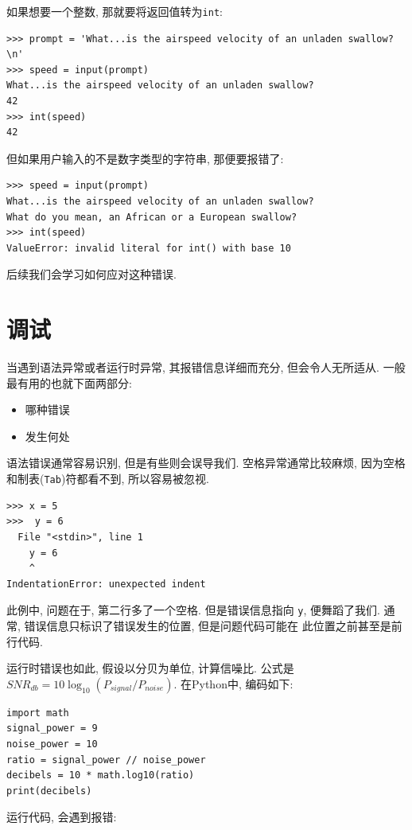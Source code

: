 \documentclass[10pt]{book}
\begin{document}
如果想要一个整数, 那就要将返回值转为{\tt int}:

\begin{verbatim}
>>> prompt = 'What...is the airspeed velocity of an unladen swallow?\n'
>>> speed = input(prompt)
What...is the airspeed velocity of an unladen swallow?
42
>>> int(speed)
42
\end{verbatim}
%
但如果用户输入的不是数字类型的字符串, 那便要报错了:

\begin{verbatim}
>>> speed = input(prompt)
What...is the airspeed velocity of an unladen swallow?
What do you mean, an African or a European swallow?
>>> int(speed)
ValueError: invalid literal for int() with base 10
\end{verbatim}
%
后续我们会学习如何应对这种错误. 


\section{调试}
\label{whitespace}

当遇到语法异常或者运行时异常, 其报错信息详细而充分, 
但会令人无所适从. 一般最有用的也就下面两部分:

\begin{itemize}

\item 哪种错误

\item 发生何处

\end{itemize}

语法错误通常容易识别, 但是有些则会误导我们. 
空格异常通常比较麻烦, 因为空格和制表({\tt Tab})符都看不到, 所以容易被忽视. 

\begin{verbatim}
>>> x = 5
>>>  y = 6
  File "<stdin>", line 1
    y = 6
    ^
IndentationError: unexpected indent
\end{verbatim}
%
此例中, 问题在于, 第二行多了一个空格. 
但是错误信息指向 {\tt y}, 便舞蹈了我们. 
通常, 错误信息只标识了错误发生的位置, 但是问题代码可能在
此位置之前甚至是前行代码. 

运行时错误也如此, 假设以分贝为单位, 计算信噪比. 
公式是$SNR_{db} = 10 \log_{10} (P_{signal} / P_{noise})$. 
在Python中, 编码如下:

\begin{verbatim}
import math
signal_power = 9
noise_power = 10
ratio = signal_power // noise_power
decibels = 10 * math.log10(ratio)
print(decibels)
\end{verbatim}
%
运行代码, 会遇到报错:
%
\end{document}
